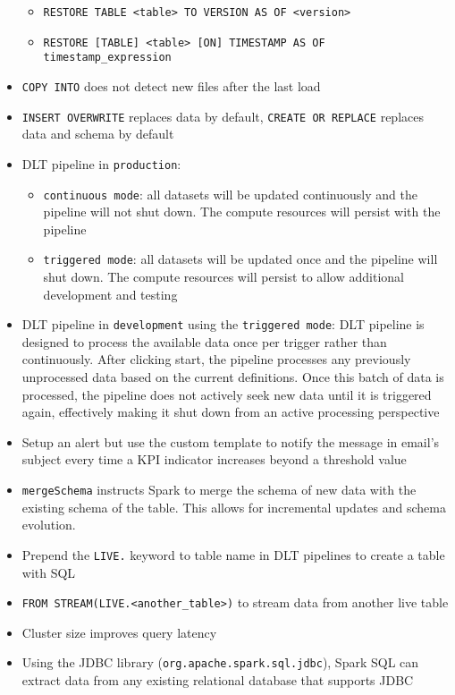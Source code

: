 \documentclass[11pt]{scrartcl}
\begin{document}
\begin{itemize}
\begin{itemize}
		\item \texttt{RESTORE TABLE <table> TO VERSION AS OF <version>}
		\item \texttt{RESTORE [TABLE] <table> [ON] TIMESTAMP AS OF timestamp\_expression} 
	\end{itemize} 
	\item \texttt{COPY INTO} does not detect new files after the last load
	\item \texttt{INSERT OVERWRITE} replaces data by default, \texttt{CREATE OR REPLACE} replaces data and schema by default
	\item DLT pipeline in \texttt{production}:
	\begin{itemize}
		\item \texttt{continuous mode}: all datasets will be updated continuously and the pipeline will not shut down. The compute resources will persist with the pipeline
		\item \texttt{triggered mode}: all datasets will be updated once and the pipeline will shut down. The compute resources will persist to allow additional development and testing
	\end{itemize}
	\item DLT pipeline in \texttt{development} using the \texttt{triggered mode}: DLT pipeline is designed to process the available data once per trigger rather than continuously. After clicking start, the pipeline processes any previously unprocessed data based on the current definitions. Once this batch of data is processed, the pipeline does not actively seek new data until it is triggered again, effectively making it shut down from an active processing perspective
	\item Setup an alert but use the custom template to notify the message in email's subject every time a KPI indicator increases beyond a threshold value
	\item \texttt{mergeSchema} instructs Spark to merge the schema of new data with the existing schema of the table. This allows for incremental updates and schema evolution.
	\item Prepend the \texttt{LIVE.} keyword to table name in DLT pipelines to create a table with SQL
	\item \texttt{FROM STREAM(LIVE.<another\_table>)} to stream data from another live table
	\item Cluster size improves query latency
	\item Using the JDBC library (\texttt{org.apache.spark.sql.jdbc}), Spark SQL can extract data from any existing relational database that supports JDBC

\end{itemize}
\end{document}
